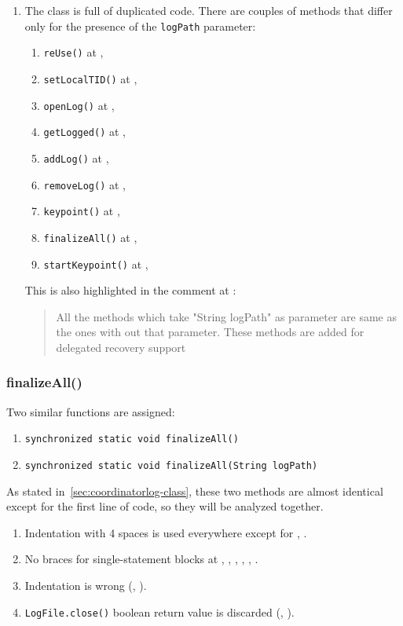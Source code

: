 \begin{enumerate}
    \item {} The class is full of duplicated code. There are couples of methods that differ only for the presence of the \texttt{logPath} parameter:
    \begin{enumerate}
        \item \texttt{reUse()} at , 
    	\item \texttt{setLocalTID()} at , 
    	\item \texttt{openLog()} at , 
    	\item \texttt{getLogged()} at , 
    	\item \texttt{addLog()} at , 
    	\item \texttt{removeLog()} at , 
    	\item \texttt{keypoint()} at , 
    	\item \texttt{finalizeAll()} at , 
    	\item \texttt{startKeypoint()} at , 
    \end{enumerate}
    This is also highlighted in the comment at :
    \begin{quote}
        All the methods which take "String logPath" as parameter are same as the ones with out that parameter. These methods are added for delegated recovery support
    \end{quote}
\end{enumerate}
\subsubsection{finalizeAll()}
Two similar functions are assigned:
\begin{enumerate}
    \item \texttt{\footnotesize synchronized static void finalizeAll()}
    \item \texttt{\footnotesize synchronized static void finalizeAll(String logPath)}
\end{enumerate}

As stated in~\autoref{sec:coordinatorlog-class}, these two methods are almost identical except for the first line of code, so they will be analyzed together.

\begin{enumerate}
    \item {} Indentation with 4 spaces is used everywhere except for , .
    \item {} No braces for single-statement blocks at , , , , , .
    \item {} Indentation is wrong (, ).
    \item {} \texttt{LogFile.close()} boolean return value is discarded (, ).
\end{enumerate}

